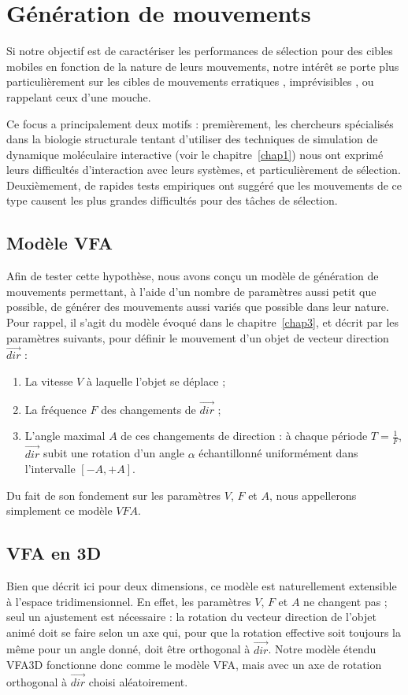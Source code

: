 \section{Génération de mouvements}
	Si notre objectif est de caractériser les performances de sélection pour des cibles mobiles en fonction de la nature de leurs mouvements, notre intérêt se porte plus particulièrement sur les cibles de mouvements \og erratiques \fg{}, \og imprévisibles \fg{}, ou rappelant ceux d'une mouche.
	
	Ce focus a principalement deux motifs : premièrement, les chercheurs spécialisés dans la biologie structurale tentant d'utiliser des techniques de simulation de dynamique moléculaire interactive (voir le chapitre~\ref{chap1}) nous ont exprimé leurs difficultés d'interaction avec leurs systèmes, et particulièrement de sélection. Deuxièmement, de rapides tests empiriques ont suggéré que les mouvements de ce type causent les plus grandes difficultés pour des tâches de sélection.
	
	\subsection{Modèle VFA}
	Afin de tester cette hypothèse, nous avons conçu un modèle de génération de mouvements permettant, à l'aide d'un nombre de paramètres aussi petit que possible, de générer des mouvements aussi variés que possible dans leur nature. Pour rappel, il s'agit du modèle évoqué dans le chapitre~\ref{chap3}, et décrit par les paramètres suivants, pour définir le mouvement d'un objet de vecteur direction $\vec{dir}$ :
	
    \begin{enumerate}
    	\item La vitesse $V$ à laquelle l'objet se déplace ;
    	\item La fréquence $F$ des changements de $\vec{dir}$ ;
    	\item L'angle maximal $A$ de ces changements de direction : à chaque période $T = \frac{1}{F}$, $\vec{dir}$ subit une rotation d'un angle $\alpha$ échantillonné uniformément dans l'intervalle $[-A, +A]$.
    \end{enumerate}
    
    Du fait de son fondement sur les paramètres $V$, $F$ et $A$, nous appellerons simplement ce modèle $VFA$.
    
    \subsection{VFA en 3D}
    Bien que décrit ici pour deux dimensions, ce modèle est naturellement extensible à l'espace tridimensionnel. En effet, les paramètres $V$, $F$ et $A$ ne changent pas ; seul un ajustement est nécessaire : la rotation du vecteur direction de l'objet animé doit se faire selon un axe qui, pour que la rotation effective soit toujours la même pour un angle donné, doit être orthogonal à $\vec{dir}$. Notre modèle étendu VFA3D fonctionne donc comme le modèle VFA, mais avec un axe de rotation orthogonal à $\vec{dir}$ choisi aléatoirement.
    

